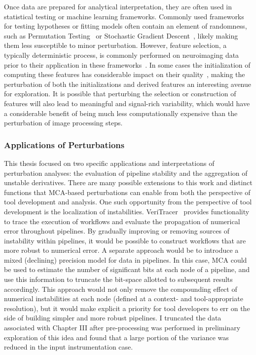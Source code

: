 Once data are prepared for analytical interpretation, they are often used in statistical testing or machine
learning frameworks. Commonly used frameworks for testing hypotheses or fitting models often contain an
element of randomness, such as Permutation Testing~\cite{oden1975arguments} or Stochastic Gradient
Descent~\cite{bottou1991stochastic}, likely making them less susceptible to minor perturbation. However,
feature selection, a typically deterministic process, is commonly performed on neuroimaging data prior to
their application in these frameworks~\cite{mwangi2014review}. In some cases the initialization of computing
these features has considerable impact on their quality~\cite{kobak2021init}, making the perturbation of both
the initializations and derived features an interesting avenue for exploration. It is possible that perturbing
the selection or construction of features will also lead to meaningful and signal-rich variability, which
would have a considerable benefit of being much less computationally expensive than the perturbation of image
processing steps.

\subsubsection{Applications of Perturbations}

This thesis focused on two specific applications and interpretations of perturbation analyses: the evaluation
of pipeline stability and the aggregation of unstable derivatives. There are many possible extensions to this
work and distinct functions that MCA-based perturbations can enable from both the perspective of tool
development and analysis. One such opportunity from the perspective of tool development is the localization of
instabilities. VeriTracer~\cite{chatelain2018veritracer} provides functionality to trace the execution of
workflows and evaluate the propagation of numerical error throughout pipelines. By gradually improving or
removing sources of instability within pipelines, it would be possible to construct workflows that are more
robust to numerical error. A separate approach would be to introduce a mixed (declining) precision model for
data in pipelines. In this case, MCA could be used to estimate the number of significant bits at each node of
a pipeline, and use this information to truncate the bit-space allotted to subsequent results accordingly. This
approach would not only remove the compounding effect of numerical instabilities at each node (defined at a
context- and tool-appropriate resolution), but it would make explicit a priority for tool developers to err on
the side of building simpler and more robust pipelines. I truncated the data associated with Chapter III after
pre-processing was performed in preliminary exploration of this idea and found that a large portion of the
variance was reduced in the input instrumentation case.


